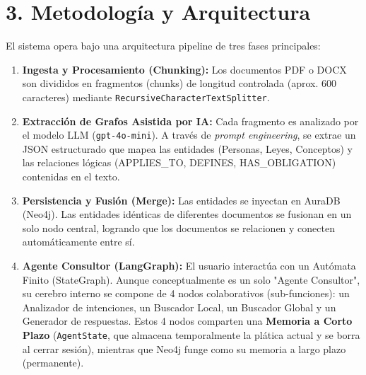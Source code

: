 \documentclass[12pt,a4paper]{article}
\begin{document}
\section*{3. Metodología y Arquitectura}
El sistema opera bajo una arquitectura pipeline de tres fases principales:
\begin{enumerate}
    \item \textbf{Ingesta y Procesamiento (Chunking):} Los documentos PDF o DOCX son divididos en fragmentos (chunks) de longitud controlada (aprox. 600 caracteres) mediante \texttt{RecursiveCharacterTextSplitter}.
    \item \textbf{Extracción de Grafos Asistida por IA:} Cada fragmento es analizado por el modelo LLM (\texttt{gpt-4o-mini}). A través de \textit{prompt engineering}, se extrae un JSON estructurado que mapea las entidades (Personas, Leyes, Conceptos) y las relaciones lógicas (APPLIES\_TO, DEFINES, HAS\_OBLIGATION) contenidas en el texto.
    \item \textbf{Persistencia y Fusión (Merge):} Las entidades se inyectan en AuraDB (Neo4j). Las entidades idénticas de diferentes documentos se fusionan en un solo nodo central, logrando que los documentos se relacionen y conecten automáticamente entre sí.
    \item \textbf{Agente Consultor (LangGraph):} El usuario interactúa con un Autómata Finito (StateGraph). Aunque conceptualmente es un solo "Agente Consultor", su cerebro interno se compone de 4 nodos colaborativos (sub-funciones): un Analizador de intenciones, un Buscador Local, un Buscador Global y un Generador de respuestas. Estos 4 nodos comparten una \textbf{Memoria a Corto Plazo} (\texttt{AgentState}, que almacena temporalmente la plática actual y se borra al cerrar sesión), mientras que Neo4j funge como su memoria a largo plazo (permanente).
\end{enumerate}
\end{document}
